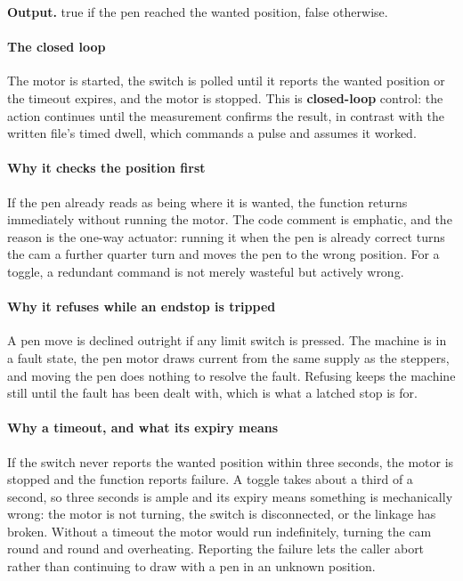 \noindent\textbf{Output.} true if the pen reached the wanted position, false otherwise.


\paragraph{The closed loop}
The motor is started, the switch is polled until it reports the wanted position or the timeout expires, and the motor is stopped. This is \textbf{closed-loop} control: the action continues until the measurement confirms the result, in contrast with the written file's timed dwell, which commands a pulse and assumes it worked.


\paragraph{Why it checks the position first}
If the pen already reads as being where it is wanted, the function returns immediately without running the motor. The code comment is emphatic, and the reason is the one-way actuator: running it when the pen is already correct turns the cam a further quarter turn and moves the pen to the wrong position. For a toggle, a redundant command is not merely wasteful but actively wrong.


\paragraph{Why it refuses while an endstop is tripped}
A pen move is declined outright if any limit switch is pressed. The machine is in a fault state, the pen motor draws current from the same supply as the steppers, and moving the pen does nothing to resolve the fault. Refusing keeps the machine still until the fault has been dealt with, which is what a latched stop is for.


\paragraph{Why a timeout, and what its expiry means}
If the switch never reports the wanted position within three seconds, the motor is stopped and the function reports failure. A toggle takes about a third of a second, so three seconds is ample and its expiry means something is mechanically wrong: the motor is not turning, the switch is disconnected, or the linkage has broken. Without a timeout the motor would run indefinitely, turning the cam round and round and overheating. Reporting the failure lets the caller abort rather than continuing to draw with a pen in an unknown position.


